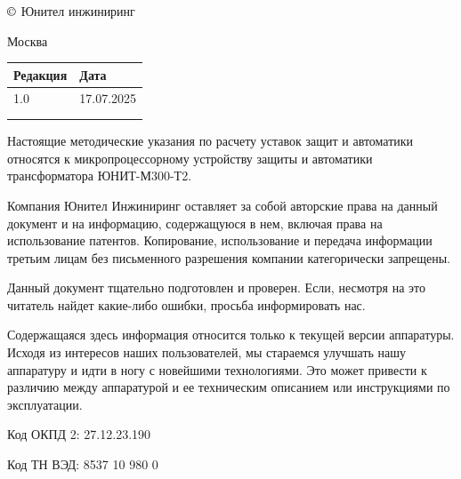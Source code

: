 \pagestyle{fancy}
\fancyhf{}
\renewcommand{\headrulewidth}{1pt}
\lhead{\color{black}{ЮТКБ.656122.609 Т2.РР1 Редакция 1.0 от 17.07.2025}}
\rfoot{{\thepage}}
\renewcommand{\footrulewidth}{1pt}


\pagecolor{white}

\begin{flushleft}
\noindent
$\copyright$
\the\year{}
Юнител инжиниринг

\vskip 3mm
Москва
\vskip 8mm

\setlength{\extrarowheight}{0.4cm} %
\begin{longtable}[l]{|>{\centering}m{4cm}|>{\centering\arraybackslash}m{4cm}|}
    \hline
    \textcolor{unigray}{Редакция} & \textcolor{unigray}{Дата} \\
    \hline
    \textcolor{unigray}{1.0} & \textcolor{unigray}{17.07.2025} \\
    \hline
     &  \\
    \hline
     &  \\
    \hline
\end{longtable}

\vskip 50mm
\noindent
Настоящие методические указания по расчету уставок защит и автоматики относятся к микропроцессорному устройству защиты и автоматики трансформатора ЮНИТ-М300-Т2.

\vskip 10mm
Компания Юнител Инжиниринг оставляет за собой авторские права на данный документ и на информацию, содержащуюся в нем, включая права на использование патентов. Копирование, использование и передача информации третьим лицам без письменного разрешения компании категорически запрещены.

\vskip 10mm
Данный документ тщательно подготовлен и проверен. Если, несмотря на это читатель найдет какие-либо ошибки, просьба информировать нас.

\vskip 10mm
Содержащаяся здесь информация относится только к текущей версии аппаратуры. Исходя из интересов наших пользователей, мы стараемся улучшать нашу аппаратуру и идти в ногу с новейшими технологиями. Это может привести к различию между аппаратурой и ее техническим описанием или инструкциями по эксплуатации.

\vskip 10mm
Код ОКПД 2: 27.12.23.190

\vskip 5mm
Код ТН ВЭД: 8537 10 980 0

\end{flushleft}